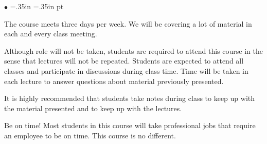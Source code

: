 \documentclass[10pt,fleqn]{article}
\begin{document}
\medskip

\noindent
\begin{list}{$\bullet$}{ \parsep=0pt \listparindent=0pt
\topsep=0pt \rightmargin=.35in \leftmargin=.35in   pt \itemsep=2pt}
  \item The course meets three days per week. We will be covering a lot of
        material in each and every class meeting. 
  \item Although role will not be taken, students are required to attend this
        course in the sense that lectures will not be repeated. Students are
        expected to attend all classes and participate in discussions during
        class time. Time will be taken in each lecture to answer questions about
        material previously presented.
  \item It is highly recommended that students take notes during class to keep
        up with the material presented and to keep up with the lectures.
  \item Be on time! Most students in this course will take professional jobs
        that require an employee to be on time. This course is no different.
\end{list}

\medskip
\end{document}
